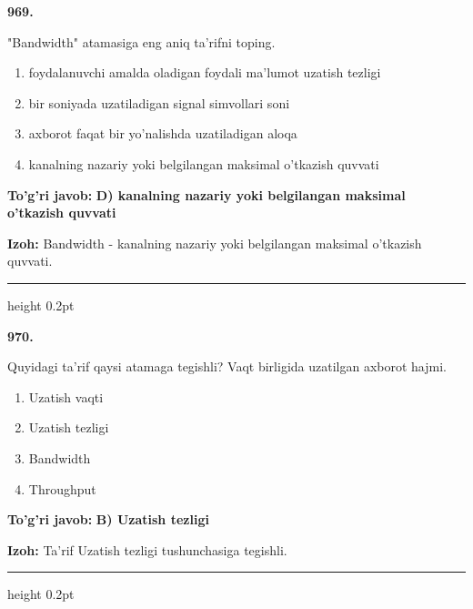 \documentclass[10pt,a4paper,oneside]{article}
\begin{document}
\noindent\textbf{\color{ink}969.}
\par
"Bandwidth" atamasiga eng aniq ta'rifni toping.
\begin{enumerate}[label=\Alph*),leftmargin=9mm]
\item foydalanuvchi amalda oladigan foydali ma'lumot uzatish tezligi
\item bir soniyada uzatiladigan signal simvollari soni
\item axborot faqat bir yo'nalishda uzatiladigan aloqa
\item kanalning nazariy yoki belgilangan maksimal o'tkazish quvvati
\end{enumerate}
\begin{tcolorbox}[enhanced,breakable,colback=teal!4,colframe=teal!50!black,boxrule=0.5pt,arc=1.1mm,left=3mm,right=3mm,top=1.7mm,bottom=1.7mm,before skip=2mm,after skip=2mm]
\textbf{\color{teal}To'g'ri javob:} \textbf{D) kanalning nazariy yoki belgilangan maksimal o'tkazish quvvati}
\par\smallskip
\textbf{Izoh:} Bandwidth - kanalning nazariy yoki belgilangan maksimal o'tkazish quvvati.
\end{tcolorbox}
\vspace{2mm}\hrule height 0.2pt \vspace{3mm}

\noindent\textbf{\color{ink}970.}
\par
Quyidagi ta'rif qaysi atamaga tegishli? Vaqt birligida uzatilgan axborot hajmi.
\begin{enumerate}[label=\Alph*),leftmargin=9mm]
\item Uzatish vaqti
\item Uzatish tezligi
\item Bandwidth
\item Throughput
\end{enumerate}
\begin{tcolorbox}[enhanced,breakable,colback=teal!4,colframe=teal!50!black,boxrule=0.5pt,arc=1.1mm,left=3mm,right=3mm,top=1.7mm,bottom=1.7mm,before skip=2mm,after skip=2mm]
\textbf{\color{teal}To'g'ri javob:} \textbf{B) Uzatish tezligi}
\par\smallskip
\textbf{Izoh:} Ta'rif Uzatish tezligi tushunchasiga tegishli.
\end{tcolorbox}
\vspace{2mm}\hrule height 0.2pt \vspace{3mm}
\end{document}
